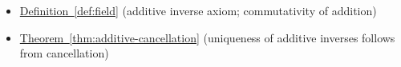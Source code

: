 \begin{dependencies}
\begin{itemize}
  \item \hyperref[def:field]{Definition~\ref*{def:field}}
        \textnormal{(additive inverse axiom; commutativity of addition)}
  \item \hyperref[thm:additive-cancellation]{Theorem~\ref*{thm:additive-cancellation}}
        \textnormal{(uniqueness of additive inverses follows from cancellation)}
\end{itemize}
\end{dependencies}

\clearpage
